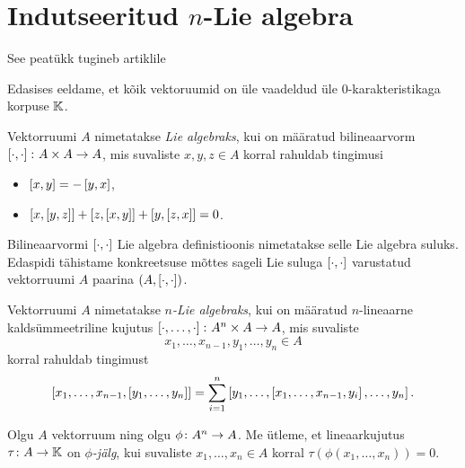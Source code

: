 

\section{Indutseeritud \texorpdfstring{$n$}\ -Lie algebra}

See peatükk tugineb artiklile \cite{AKMS:2014}

Edasises eeldame, et kõik vektoruumid on üle vaadeldud üle
$0$-karakteristikaga korpuse $\mathbb{K}$.

\begin{dfn}\label{def:lie_algebra}
    Vektorruumi $A$ nimetatakse \emph{Lie algebraks}, kui on
    määratud bilineaarvorm
    $\left[ \cdot, \cdot \right] \colon A \times A \rightarrow A$, mis
    suvaliste $x, y, z \in A$ korral rahuldab tingimusi
    \begin{itemize}
        \item $\left[ x, y \right] = -\left[ y, x \right]$,
        \item $\left[ x, \left[ y, z \right] \right] + 
               \left[ z, \left[ x, y \right] \right] +
               \left[ y, \left[ z, x \right] \right] = 0$.
    \end{itemize}
\end{dfn}

Bilineaarvormi $\left[ \cdot, \cdot \right]$ Lie algebra definistioonis
nimetatakse selle Lie algebra suluks. Edaspidi tähistame konkreetsuse
mõttes sageli Lie suluga $\left[ \cdot, \cdot \right]$ varustatud vektorruumi
$A$ paarina $(A, \left[ \cdot, \cdot \right])$.

\begin{dfn}
    Vektorruumi $A$ nimetatakse \emph{$n$-Lie algebraks}, kui on
    määratud $n$-lineaarne kaldsümmeetriline kujutus
    $\left[ \cdot, \dots, \cdot \right] \colon A^n \times A \rightarrow A$, mis
    suvaliste
    \[ x_1, \dots, x_{n-1}, y_1, \dots, y_n \in A \]
    korral rahuldab tingimust
    \[
        \left[ x_1, \dots, x_{n-1}, \left[ y_1, \dots, y_n \right] \right] =
        \sum_{i=1}^n \left[
            y_1, \dots, \left[ x_1, \dots, x_{n-1}, y_i \right], \dots, y_n
        \right].
    \]
\end{dfn}

\begin{dfn}[Jälg]
    Olgu $A$ vektorruum ning olgu $\phi \colon A^n \rightarrow A$. Me
    ütleme, et lineaarkujutus $\tau \colon A \rightarrow \mathbb{K}$ on
    \emph{$\phi$-jälg}, kui suvaliste $x_1, \dots, x_n \in A$ korral
    $\tau \left( \phi \left( x_1, \dots, x_n \right) \right) = 0$.
\end{dfn}

